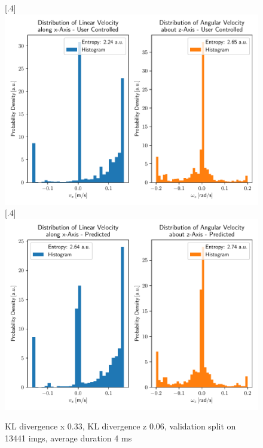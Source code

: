 \begin{figure}[h]
	\centering
	\subcaptionbox{}%
	[.4\linewidth]{\includegraphics[scale=.35]{chapters/05_experiments/04_autonomous_walking/user_entropy.pdf}}
	\subcaptionbox{}%
	[.4\linewidth]{\includegraphics[scale=.35]{chapters/05_experiments/04_autonomous_walking/predicted_entropy_kldivx_0_33_kldivz_0_06_imgs_13441_duration_4_ms.pdf}}
	\caption{KL divergence x 0.33, KL divergence z 0.06, validation split on 13441 imgs, average duration 4 ms}
	\label{fig::542_training_dist}
\end{figure}
